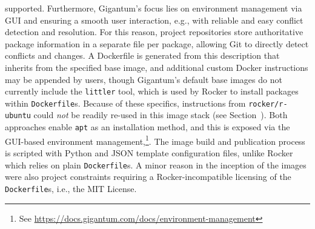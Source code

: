 supported. Furthermore, Gigantum's focus lies on environment management
via GUI and ensuring a smooth user interaction, e.g., with reliable and
easy conflict detection and resolution. For this reason, project
repositories store authoritative package information in a separate file
per package, allowing Git to directly detect conflicts and changes. A
Dockerfile is generated from this description that inherits from the
specified base image, and additional custom Docker instructions may be
appended by users, though Gigantum's default base images do not
currently include the \texttt{littler} tool, which is used by Rocker to
install packages within \texttt{Dockerfile}s. Because of these
specifics, instructions from \texttt{rocker/r-ubuntu} could \emph{not}
be readily re-used in this image stack (see
Section~). Both approaches enable \texttt{apt} as
an installation method, and this is exposed via the GUI-based
environment
management,\footnote{See \href{https://docs.gigantum.com/docs/environment-management}{https://docs.gigantum.com/docs/environment-management}}.
The image build and publication process is scripted with Python and JSON
template configuration files, unlike Rocker which relies on plain
\texttt{Dockerfile}s. A minor reason in the inception of the images were
also project constraints requiring a Rocker-incompatible licensing of
the \texttt{Dockerfile}s, i.e., the MIT License.

